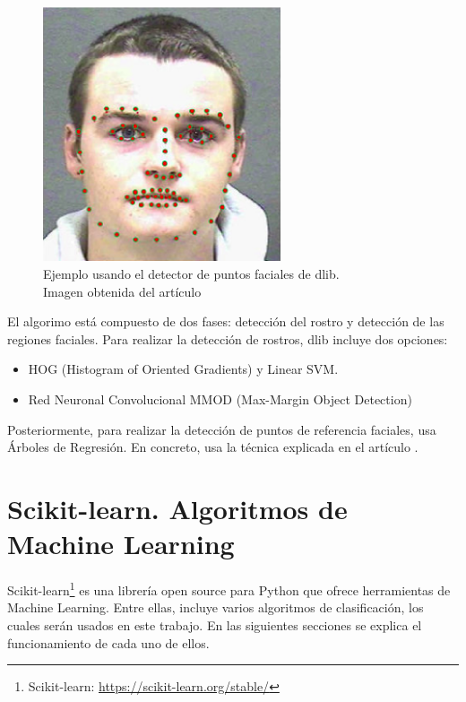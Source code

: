 \begin{figure} [h!]
  \begin{center}
    \includegraphics[width=70mm]{figs/dlib_example.png}
  \end{center}
  \captionsetup{justification=centering}
  \caption{Ejemplo usando el detector de puntos faciales de dlib.\\
  Imagen obtenida del artículo \cite{dlib_example}}
  \label{fig:dlib_example}
\end{figure}

El algorimo está compuesto de dos fases: detección del rostro y detección de las regiones faciales. Para realizar la detección de rostros, dlib incluye dos opciones:

\begin{itemize}
    \item HOG (Histogram of Oriented Gradients) y Linear SVM.
    \item Red Neuronal Convolucional MMOD (Max-Margin Object Detection)
\end{itemize}

Posteriormente, para realizar la detección de puntos de referencia faciales, usa Árboles de Regresión. En concreto, usa la técnica explicada en el artículo \cite{facial_landmarks_dlib}.

\section{Scikit-learn. Algoritmos de Machine Learning}
\label{sec:sklearn}

Scikit-learn\footnote{Scikit-learn: \url{https://scikit-learn.org/stable/}} es una librería open source para Python que ofrece herramientas de Machine Learning. Entre ellas, incluye varios algoritmos de clasificación, los cuales serán usados en este trabajo. En las siguientes secciones se explica el funcionamiento de cada uno de ellos.

